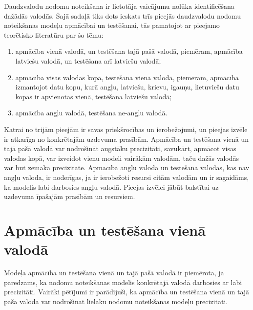 Daudzvalodu nodomu noteikšana ir lietotāja vaicājumu nolūka identificēšana dažādās valodās. Šajā sadaļā tiks dots ieskats trīs pieejās daudzvalodu nodomu noteikšanas modeļu apmācībai un testēšanai, tās pamatojot ar pieejamo teorētisko literatūru par šo tēmu:
\begin{enumerate}
	\item apmācība vienā valodā, un testēšana tajā pašā valodā, piemēram, apmācība latviešu valodā, un testēšana arī latviešu valodā;
	\item apmācība visās valodās kopā, testēšana vienā valodā, piemēram, apmācībā izmantojot datu kopu, kurā angļu, latviešu, krievu, igauņu, lietuviešu datu kopas ir apvienotas vienā, testēšana latviešu valodā;
	\item apmācība angļu valodā, testēšana ne-angļu valodā.
\end{enumerate}

Katrai no trijām pieejām ir savas priekšrocības un ierobežojumi, un pieejas izvēle ir atkarīga no konkrētajām uzdevuma prasībām. Apmācība un testēšana vienā un tajā pašā valodā var nodrošināt augstāku precizitāti, savukārt, apmācot visas valodas kopā, var izveidot vienu modeli vairākām valodām, taču dažās valodās var būt zemāka precizitāte. Apmācība angļu valodā un testēšana valodās, kas nav angļu valoda, ir noderīgas, ja ir ierobežoti resursi citām valodām un ir sagaidāms, ka modelis labi darbosies angļu valodā. Pieejas izvēlei jābūt balstītai uz uzdevuma īpašajām prasībām un resursiem.


\section{Apmācība un testēšana vienā valodā}

Modeļa apmācība un testēšana vienā un tajā pašā valodā ir piemērota, ja paredzams, ka nodomu noteikšanas modelis konkrētajā valodā darbosies ar labi precizitāti. Vairāki pētījumi ir parādījuši, ka apmācība un testēšana vienā un tajā pašā valodā var nodrošināt lielāku nodomu noteikšanas modeļu precizitāti. 

